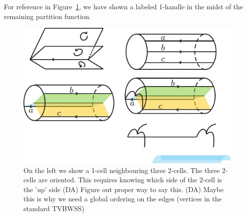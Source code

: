 \documentclass[12pt,a4paper]{article}
\newcommand{\dave}[1]{{\color{ao(english)}\footnotesize{(DA) #1}}}
\begin{document}
For reference in Figure~\ref{OneHandle}, we have shown a labeled 1-handle in the midst of the remaining partition function. 
\begin{figure}
\begin{center}
\includegraphics{Onehandle.pdf}
\caption{\label{OneHandle}
On the left we show a 1-cell neighbouring three 2-cells. 
The three 2-cells are oriented.
This requires knowing which side of the 2-cell is the 'up' side
\dave{Figure out proper way to say this.}
\dave{Maybe this is why we need a global ordering on the edges (vertices in the standard TVBWSS)}
}
\end{center}
\end{figure}
\end{document}
